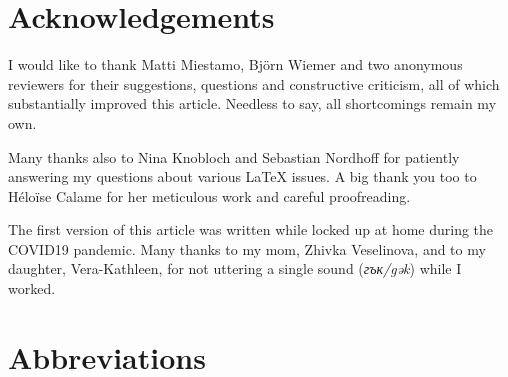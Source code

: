 \documentclass[output=paper,colorlinks=true, citecolor=brown]{langscibook}
\begin{document}
\section*{Acknowledgements}
I would like to thank Matti Miestamo, Björn Wiemer and two anonymous reviewers for their suggestions, questions and constructive criticism, all of which substantially improved this article. Needless to say, all shortcomings remain my own.

Many thanks also to Nina Knobloch and Sebastian Nordhoff for patiently answering my questions about various LaTeX issues. A big thank you too to Héloïse Calame for her meticulous work and careful proofreading.

The first version of this article was written while locked up at home during the COVID19 pandemic. Many thanks to my mom, Zhivka Veselinova, and to my daughter, Vera-Kathleen, for not uttering a single sound (\textit{гък/gək}) while I worked.


\section*{Abbreviations}
\end{document}
